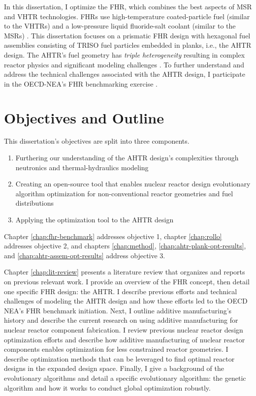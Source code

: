 In this dissertation, I optimize the \gls{FHR}, which 
combines the best aspects of \gls{MSR} and \gls{VHTR} technologies. 
\glspl{FHR} use high-temperature coated-particle fuel (similar to the \glspl{VHTR}) 
and a low-pressure liquid fluoride-salt coolant (similar to the \glspl{MSR})
\cite{forsberg_fluoride-salt-cooled_2012,facilitators_fluoride-salt-cooled_2013}.
This dissertation focuses on a prismatic \gls{FHR} design with hexagonal fuel 
assemblies consisting of \gls{TRISO} fuel particles embedded in planks, i.e., 
the \gls{AHTR} design.
The \gls{AHTR}'s fuel geometry has \emph{triple heterogeneity} resulting in 
complex reactor physics and significant modeling challenges 
\cite{petrovic_benchmark_2021}. 
To further understand and address the technical challenges associated with the 
\gls{AHTR} design, I participate in the \gls{OECD}-\gls{NEA}'s \gls{FHR} 
benchmarking exercise \cite{petrovic_benchmark_2021}.

\section{Objectives and Outline}
This dissertation's objectives are split into three components. 
\begin{enumerate}
    \item Furthering our understanding of the \gls{AHTR} design's complexities 
    through neutronics and thermal-hydraulics modeling 
    \item Creating an open-source tool that enables nuclear reactor design 
    evolutionary algorithm optimization for non-conventional reactor geometries and fuel 
    distributions
    \item Applying the optimization tool to the \gls{AHTR} design 
\end{enumerate}
Chapter \ref{chap:fhr-benchmark} addresses objective 1, chapter \ref{chap:rollo} 
addresses objective 2, and chapters \ref{chap:method}, \ref{chap:ahtr-plank-opt-results}, 
and \ref{chap:ahtr-assem-opt-results} address objective 3. 

Chapter \ref{chap:lit-review} presents a literature review that organizes and 
reports on previous relevant work. 
I provide an overview of the \gls{FHR} concept, then detail one specific 
\gls{FHR} design: the \gls{AHTR}. 
I describe previous efforts and technical challenges of modeling the \gls{AHTR} design
and how these efforts led to the \gls{OECD} \gls{NEA}'s \gls{FHR} benchmark initiation.
Next, I outline additive manufacturing's history and describe the current 
research on using additive manufacturing for nuclear reactor component fabrication. 
I review previous nuclear reactor design optimization efforts and describe how 
additive manufacturing of nuclear reactor components enables optimization for 
less constrained reactor geometries. 
I describe optimization methods that can be leveraged to find optimal reactor 
designs in the expanded design space.
Finally, I give a background of the evolutionary algorithms and detail a specific 
evolutionary algorithm: the genetic algorithm and how it works to conduct global 
optimization robustly.

